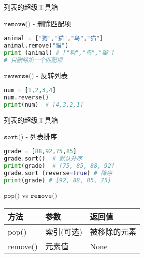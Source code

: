 \documentclass{beamer}
\begin{document}
\begin{frame}[fragile]{列表的超级工具箱}

\begin{block}{$\texttt{remove()}$ - 删除匹配项}
\begin{lstlisting}[language=Python]
animal = ["狗","猫","鸟","猫"]
animal.remove("猫")  
print (animal) # ["狗","鸟","猫"]
# 只删除第一个匹配项
\end{lstlisting}
\end{block}

\begin{block}{$\texttt{reverse()}$ - 反转列表}
\begin{lstlisting}[language=Python]
num = [1,2,3,4]
num.reverse()
print(num)  # [4,3,2,1]
\end{lstlisting}
\end{block}

\end{frame}

\begin{frame}[fragile]{列表的超级工具箱}

\begin{block}{$\texttt{sort()}$ - 列表排序}
\begin{lstlisting}[language=Python]
grade = [88,92,75,85]
grade.sort()  # 默认升序
print(grade)  # [75, 85, 88, 92]
grade.sort (reverse=True) # 降序
print(grade) # [92, 88, 85, 75]
\end{lstlisting}
\end{block}

\begin{block}{$\texttt{pop()}$ vs $\texttt{remove()}$}
\begin{tabular}{|l|l|l|}
\hline
\textcolor{cuhksz1}{方法} & \textcolor{cuhksz1}{参数} & \textcolor{cuhksz1}{返回值} \\ \hline
pop() & 索引(可选) & 被移除的元素 \\ \hline
remove() & 元素值 & None \\ \hline
\end{tabular}
\end{block}
\end{frame}
\end{document}
